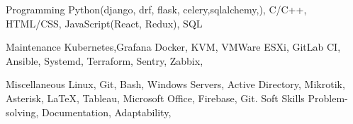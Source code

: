 

\begin{cvskills}

  \cvskill
    {Programming}
    {Python(django, drf, flask, celery,sqlalchemy,), C/C++, HTML/CSS, JavaScript(React, Redux), SQL} %

  \cvskill
    {Maintenance}
    {Kubernetes,Grafana Docker, KVM, VMWare ESXi, GitLab CI, Ansible, Systemd, Terraform, Sentry, Zabbix, } %

  \cvskill
    {Miscellaneous} %
    {Linux, Git, Bash, Windows Servers, Active Directory, Mikrotik, Asterisk, \LaTeX, Tableau, Microsoft Office, Firebase, Git.} %
  \cvskill
    {Soft Skills} %
    {Problem-solving, Documentation, Adaptability, } %

\end{cvskills}
